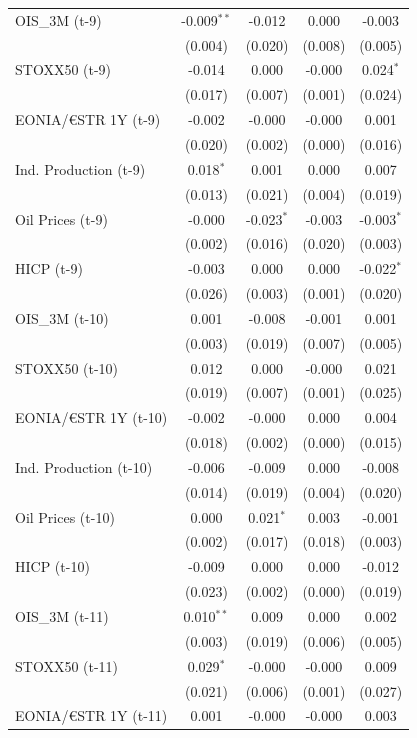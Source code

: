 \begin{longtable}[t]{lcccc}
OIS\_3M (t-9) & -0.009$^{**}$ & -0.012 & 0.000 & -0.003\\
 & (0.004) & (0.020) & (0.008) & (0.005)\\
STOXX50 (t-9) & -0.014 & 0.000 & -0.000 & 0.024$^{*}$\\
 & (0.017) & (0.007) & (0.001) & (0.024)\\
EONIA/€STR 1Y (t-9) & -0.002 & -0.000 & -0.000 & 0.001\\
 & (0.020) & (0.002) & (0.000) & (0.016)\\
Ind. Production (t-9) & 0.018$^{*}$ & 0.001 & 0.000 & 0.007\\
 & (0.013) & (0.021) & (0.004) & (0.019)\\
Oil Prices (t-9) & -0.000 & -0.023$^{*}$ & -0.003 & -0.003$^{*}$\\
 & (0.002) & (0.016) & (0.020) & (0.003)\\
HICP (t-9) & -0.003 & 0.000 & 0.000 & -0.022$^{*}$\\
 & (0.026) & (0.003) & (0.001) & (0.020)\\
OIS\_3M (t-10) & 0.001 & -0.008 & -0.001 & 0.001\\
 & (0.003) & (0.019) & (0.007) & (0.005)\\
STOXX50 (t-10) & 0.012 & 0.000 & -0.000 & 0.021\\
 & (0.019) & (0.007) & (0.001) & (0.025)\\
EONIA/€STR 1Y (t-10) & -0.002 & -0.000 & 0.000 & 0.004\\
 & (0.018) & (0.002) & (0.000) & (0.015)\\
Ind. Production (t-10) & -0.006 & -0.009 & 0.000 & -0.008\\
 & (0.014) & (0.019) & (0.004) & (0.020)\\
Oil Prices (t-10) & 0.000 & 0.021$^{*}$ & 0.003 & -0.001\\
 & (0.002) & (0.017) & (0.018) & (0.003)\\
HICP (t-10) & -0.009 & 0.000 & 0.000 & -0.012\\
 & (0.023) & (0.002) & (0.000) & (0.019)\\
OIS\_3M (t-11) & 0.010$^{**}$ & 0.009 & 0.000 & 0.002\\
 & (0.003) & (0.019) & (0.006) & (0.005)\\
STOXX50 (t-11) & 0.029$^{*}$ & -0.000 & -0.000 & 0.009\\
 & (0.021) & (0.006) & (0.001) & (0.027)\\
EONIA/€STR 1Y (t-11) & 0.001 & -0.000 & -0.000 & 0.003\\

\end{longtable}
